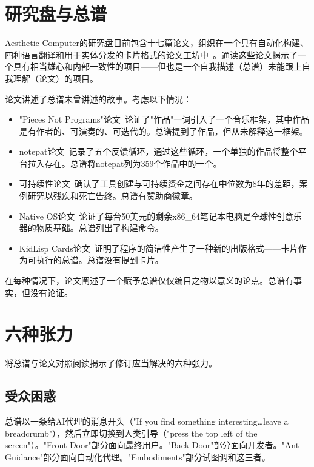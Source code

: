 \documentclass[10pt,letterpaper,twocolumn]{article}
\begin{document}
\section{研究盘与总谱}

Aesthetic Computer的研究盘目前包含十七篇论文，组织在一个具有自动化构建、四种语言翻译和用于实体分发的卡片格式的论文工坊中~\citep{scudder2026cards}。通读这些论文揭示了一个具有相当雄心和内部一致性的项目——但也是一个自我描述（总谱）未能跟上自我理解（论文）的项目。

论文讲述了总谱未曾讲述的故事。考虑以下情况：

\begin{itemize}
\item "Pieces Not Programs"论文~\citep{scudder2026pieces}论证了"作品"一词引入了一个音乐框架，其中作品是有作者的、可演奏的、可迭代的。总谱提到了作品，但从未解释这一框架。
\item notepat论文~\citep{scudder2026notepat}记录了五个反馈循环，通过这些循环，一个单独的作品将整个平台拉入存在。总谱将notepat列为359个作品中的一个。
\item 可持续性论文~\citep{scudder2026sustainability}确认了工具创建与可持续资金之间存在中位数为8年的差距，案例研究以残疾和死亡告终。总谱有赞助商徽章。
\item Native OS论文~\citep{scudder2026os}论证了每台50美元的剩余x86\_64笔记本电脑是全球性创意乐器的物质基础。总谱列出了构建命令。
\item KidLisp Cards论文~\citep{scudder2026cards}证明了程序的简洁性产生了一种新的出版格式——卡片作为可执行的总谱。总谱没有提到卡片。
\end{itemize}

在每种情况下，论文阐述了一个赋予总谱仅仅编目之物以意义的论点。总谱有事实，但没有论证。

\section{六种张力}

将总谱与论文对照阅读揭示了修订应当解决的六种张力。

\subsection{受众困惑}

总谱以一条给AI代理的消息开头（"If you find something interesting\ldots leave a breadcrumb"），然后立即切换到人类引导（"press the top left of the screen"）。"Front Door"部分面向最终用户。"Back Door"部分面向开发者。"Ant Guidance"部分面向自动化代理。"Embodiments"部分试图调和这三者。
\end{document}
